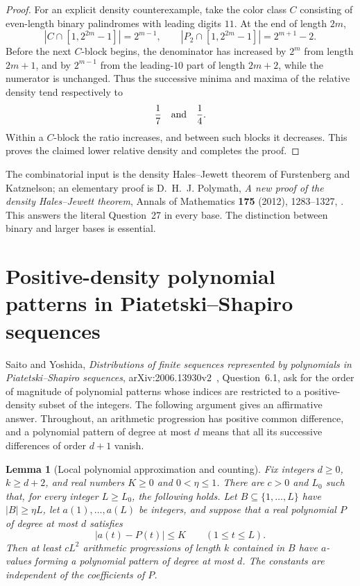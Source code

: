 \documentclass[11pt,a4paper]{article}
\newtheorem{lemma}[theorem]{Lemma}
\theoremstyle{definition}
\theoremstyle{remark}
\numberwithin{equation}{section}
\begin{document}
\begin{proof}
For an explicit density counterexample, take the color class $C$ consisting
of even-length binary palindromes with leading digits $11$.
At the end of length $2m$,
\[
 |C\cap[1,2^{2m}-1]|=2^{m-1},\qquad
 |P_2\cap[1,2^{2m}-1]|=2^{m+1}-2.
\]
Before the next $C$-block begins, the denominator has increased by $2^m$
from length $2m+1$, and by $2^{m-1}$ from the leading-$10$ part of length
$2m+2$, while the numerator is unchanged.  Thus the successive minima and
maxima of the relative density tend respectively to
\[
 \frac{1}{7}\quad\hbox{and}\quad\frac{1}{4}.
\]
Within a $C$-block the ratio increases, and between such blocks it decreases.
This proves the claimed lower relative density and completes the proof.
\end{proof}

The combinatorial input is the density Hales--Jewett theorem of Furstenberg
and Katznelson; an elementary proof is D.~H.~J. Polymath, \emph{A new proof
of the density Hales--Jewett theorem}, Annals of Mathematics
\textbf{175} (2012), 1283--1327,
\cite{Polymath2012}.
This answers the literal Question~27 in every base. The distinction between
binary and larger bases is essential.


\section{Positive-density polynomial patterns in Piatetski--Shapiro sequences}

Saito and Yoshida, \emph{Distributions of finite sequences represented by
polynomials in Piatetski--Shapiro sequences}, arXiv:2006.13930v2~\cite{SaitoYoshidaPatterns2021},
Question~6.1, ask for the order of magnitude of polynomial patterns whose
indices are restricted to a positive-density subset of the integers.
The following argument gives an affirmative answer. Throughout, an
arithmetic progression has positive common difference, and a polynomial
pattern of degree at most $d$ means that all its successive differences
of order $d+1$ vanish.

\begin{lemma}[Local polynomial approximation and counting]\label{sur:lem:local-density}
Fix integers $d\geq0$, $k\geq d+2$, and real numbers $K\geq0$ and
$0<\eta\leq1$. There are $c>0$ and $L_0$ such that, for every integer
$L\geq L_0$, the following holds. Let $B\subseteq\{1,\ldots,L\}$ have
$|B|\geq\eta L$, let $a(1),\ldots,a(L)$ be integers, and suppose that a
real polynomial $P$ of degree at most $d$ satisfies
\[
 |a(t)-P(t)|\leq K\qquad(1\leq t\leq L).
\]
Then at least $cL^2$ arithmetic progressions of length $k$ contained in
$B$ have $a$-values forming a polynomial pattern of degree at most $d$.
The constants are independent of the coefficients of $P$.
\end{lemma}
\end{document}
